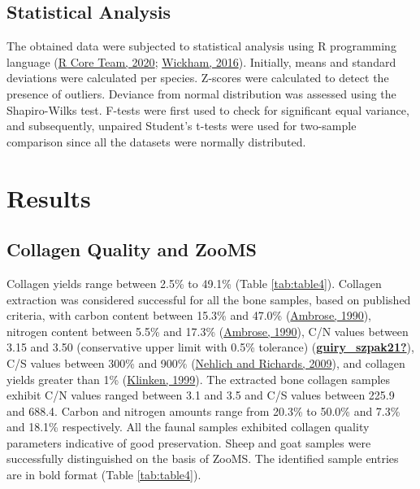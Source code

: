 \documentclass[preprint, 3p, authoryear]{elsarticle} %
\begin{document}
\hypertarget{statistical-analysis}{%
\subsection{Statistical Analysis}\label{statistical-analysis}}

The obtained data were subjected to statistical analysis using R programming language (\protect\hyperlink{ref-rcoreteam20}{R Core Team, 2020}; \protect\hyperlink{ref-wickham16}{Wickham, 2016}). Initially, means and standard deviations were calculated per species. Z-scores were calculated to detect the presence of outliers. Deviance from normal distribution was assessed using the Shapiro-Wilks test. F-tests were first used to check for significant equal variance, and subsequently, unpaired Student's t-tests were used for two-sample comparison since all the datasets were normally distributed.

\hypertarget{results}{%
\section{Results}\label{results}}

\hypertarget{collagen-quality-and-zooms}{%
\subsection{Collagen Quality and ZooMS}\label{collagen-quality-and-zooms}}

Collagen yields range between 2.5\% to 49.1\% (Table \ref{tab:table4}). Collagen extraction was considered successful for all the bone samples, based on published criteria, with carbon content between 15.3\% and 47.0\% (\protect\hyperlink{ref-ambrose90}{Ambrose, 1990}), nitrogen content between 5.5\% and 17.3\% (\protect\hyperlink{ref-ambrose90}{Ambrose, 1990}), C/N values between 3.15 and 3.50 (conservative upper limit with 0.5\% tolerance) (\protect\hyperlink{ref-guiry_szpak21}{\textbf{guiry\_szpak21?}}), C/S values between 300\% and 900\% (\protect\hyperlink{ref-nehlich_richards09}{Nehlich and Richards, 2009}), and collagen yields greater than 1\% (\protect\hyperlink{ref-vanklinken99}{Klinken, 1999}). The extracted bone collagen samples exhibit C/N values ranged between 3.1 and 3.5 and C/S values between 225.9 and 688.4. Carbon and nitrogen amounts range from 20.3\% to 50.0\% and 7.3\% and 18.1\% respectively. All the faunal samples exhibited collagen quality parameters indicative of good preservation.
Sheep and goat samples were successfully distinguished on the basis of ZooMS. The identified sample entries are in bold format (Table \ref{tab:table4}).
\end{document}
